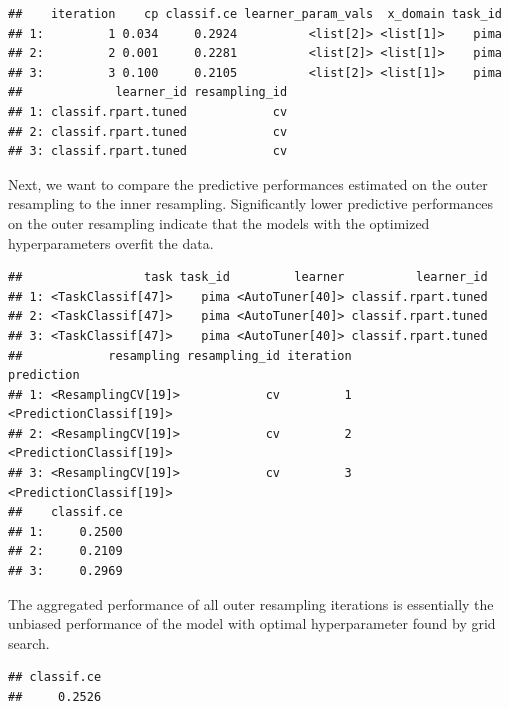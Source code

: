 \documentclass[
]{scrbook}
\newenvironment{Shaded}{\begin{snugshade}}{\end{snugshade}}
\newcommand{\FunctionTok}[1]{\textcolor[rgb]{0.00,0.00,0.00}{#1}}
\newcommand{\NormalTok}[1]{#1}
\newcommand{\SpecialCharTok}[1]{\textcolor[rgb]{0.00,0.00,0.00}{#1}}
\renewenvironment{Shaded} {\begin{snugshade}\small} {\end{snugshade}}
\begin{document}
\begin{verbatim}
##    iteration    cp classif.ce learner_param_vals  x_domain task_id
## 1:         1 0.034     0.2924          <list[2]> <list[1]>    pima
## 2:         2 0.001     0.2281          <list[2]> <list[1]>    pima
## 3:         3 0.100     0.2105          <list[2]> <list[1]>    pima
##             learner_id resampling_id
## 1: classif.rpart.tuned            cv
## 2: classif.rpart.tuned            cv
## 3: classif.rpart.tuned            cv
\end{verbatim}

Next, we want to compare the predictive performances estimated on the outer resampling to the inner resampling.
Significantly lower predictive performances on the outer resampling indicate that the models with the optimized hyperparameters overfit the data.

\begin{Shaded}
\end{Shaded}

\begin{verbatim}
##                 task task_id         learner          learner_id
## 1: <TaskClassif[47]>    pima <AutoTuner[40]> classif.rpart.tuned
## 2: <TaskClassif[47]>    pima <AutoTuner[40]> classif.rpart.tuned
## 3: <TaskClassif[47]>    pima <AutoTuner[40]> classif.rpart.tuned
##            resampling resampling_id iteration              prediction
## 1: <ResamplingCV[19]>            cv         1 <PredictionClassif[19]>
## 2: <ResamplingCV[19]>            cv         2 <PredictionClassif[19]>
## 3: <ResamplingCV[19]>            cv         3 <PredictionClassif[19]>
##    classif.ce
## 1:     0.2500
## 2:     0.2109
## 3:     0.2969
\end{verbatim}

The aggregated performance of all outer resampling iterations is essentially the unbiased performance of the model with optimal hyperparameter found by grid search.

\begin{Shaded}
\end{Shaded}

\begin{verbatim}
## classif.ce 
##     0.2526
\end{verbatim}
\end{document}
